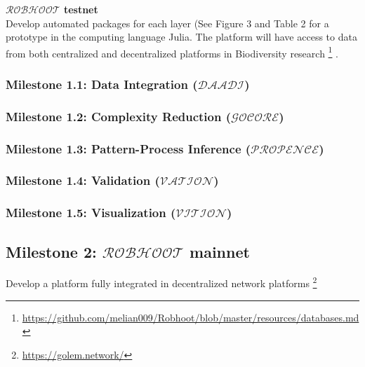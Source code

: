 \documentclass[english,12pt]{article}
\begin{document}
\begin{mybox}\begin{singlespace}
    {\bf{$\mathcal{ROBHOOT}$ testnet}}\\
    Develop automated packages for each layer (See Figure 3 and Table
    2 for a prototype in the computing language Julia. The platform
    will have access to data from both centralized and decentralized
    platforms in Biodiversity research
    \footnote{\url{https://github.com/melian009/Robhoot/blob/master/resources/databases.md}}
    .
 \begin{small}
\subsubsection{Milestone 1.1: Data Integration ($\mathcal{DAADI}$)}

\subsubsection{Milestone 1.2: Complexity Reduction ($\mathcal{GOCORE}$)}

\subsubsection{Milestone 1.3: Pattern-Process Inference ($\mathcal{PROPENCE}$)}
  
\subsubsection{Milestone 1.4: Validation ($\mathcal{VATION}$)}

\subsubsection{Milestone 1.5: Visualization ($\mathcal{VITION}$)}

\end{small}
\end{singlespace}
\end{mybox}

\subsection{Milestone 2: $\mathcal{ROBHOOT}$ mainnet}
Develop a platform fully integrated in decentralized network platforms \footnote{\url{https://golem.network/}}
\end{document}
